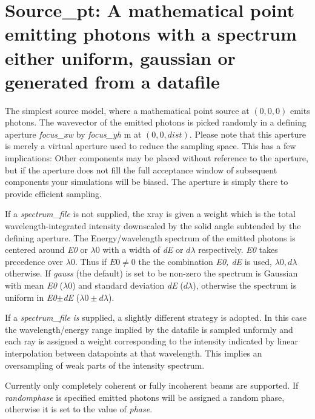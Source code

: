 \section{Source\_pt: A mathematical point emitting photons with a spectrum either uniform, gaussian or generated from a datafile}
\label{source-pt}

The simplest source model, where a mathematical point source at $(0,0,0)$ emits photons. The wavevector of the emitted photons
is picked randomly in a defining aperture \emph{focus\_xw} by \emph{focus\_yh} m at $(0,0,\mathit{dist})$. 
Please note that this aperture is merely a
virtual aperture used to reduce the sampling space. This has a few
implications: Other components may be placed without reference to the aperture,
but if the aperture does not fill the full acceptance window of subsequent
components your simulations will be biased. The aperture is simply there to provide efficient sampling.

If a \textit{spectrum\_file} is not supplied, the xray
is given a weight which is the total wavelength-integrated intensity downscaled
by the solid angle subtended by the defining aperture.
The Energy/wavelength spectrum of the emitted photons is centered around \textit{E0} or  $\lambda 0$ with a width of \textit{dE} or $d\lambda$ respectively. 
\textit{E0} takes precedence over $\lambda0$. Thus if $E0\neq0$ the the combination \textit{E0, dE} is used, $\lambda0,d\lambda$ otherwise.
If \textit{gauss} (the default) is set to be non-zero the spectrum is Gaussian with mean \textit{E0} ($\lambda 0$) and standard deviation \textit{dE} ($d\lambda$), otherwise the
spectrum is uniform in \textit{E0}$\pm$\textit{dE} ($\lambda 0\pm d\lambda$).

If a \textit{spectrum\_file} \emph{is} supplied, a slightly different strategy is adopted. In this case the
wavelength/energy range implied by the datafile is sampled unformly and each ray is assigned
a weight corresponding to the intensity indicated by linear interpolation between datapoints
at that wavelength. This implies an oversampling of weak parts of the intensity spectrum.

Currently only completely coherent or fully incoherent beams are supported. If
\textit{randomphase} is specified emitted photons will be assigned a random phase, otherwise it is
set to the value of \textit {phase}.

